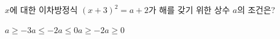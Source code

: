 $x$에 대한 이차방정식 $(x+3)^2=a+2$가 해를 갖기 위한 상수 $a$의 조건은?
\begin{choices32}{$a\ge -3$}{$a\le -2$}{$a\le 0$}{$a\ge -2$}{$a\ge 0$}\end{choices32}
